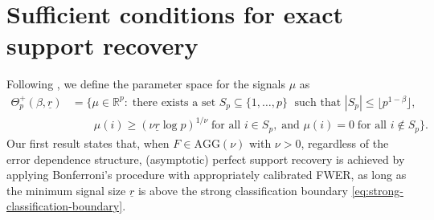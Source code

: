 


\section{Sufficient conditions for exact support recovery}
\label{subsec:sufficient}

Following \citet*{butucea2018variable}, we define the parameter space for the signals $\mu$ as
\begin{align} \label{eq:minimax-signal-config-over}
    \Theta_p^+(\beta, \underline{r}) &= \{\mu\in\mathbb{R}^p:\;\text{there exists a set }S_p\subseteq\{1,\ldots,p\}\;\text{ such that }|S_p|\le\lfloor p^{1-\beta}\rfloor, \nonumber \\
    &\quad\quad\mu(i)\ge (\nu\underline{r}\log{p})^{1/\nu}\;\text{for all }i\in S_p,\;\text{and }\mu(i)=0\;\text{for all }i\not\in S_p\}.
\end{align}
Our first result states that, when $F\in \text{AGG}(\nu)$ with $\nu>0$, regardless of the error dependence structure, (asymptotic) perfect support recovery is achieved by applying Bonferroni's procedure with appropriately calibrated FWER, as long as the minimum signal size $\underline{r}$ is above the strong classification boundary \eqref{eq:strong-classification-boundary}.

